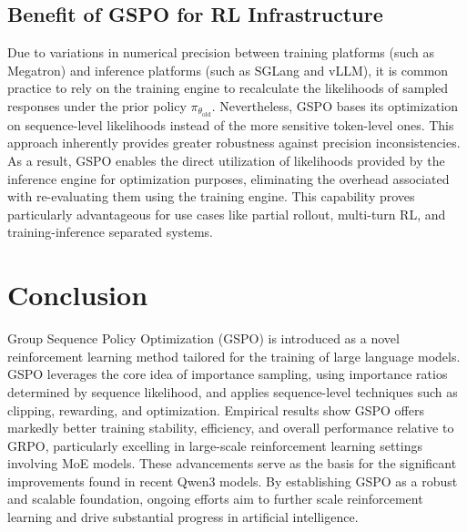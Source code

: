 \subsection{Benefit of GSPO for RL Infrastructure}

Due to variations in numerical precision between training platforms (such as Megatron) and inference platforms (such as SGLang and vLLM), it is common practice to rely on the training engine to recalculate the likelihoods of sampled responses under the prior policy $\pi_{\theta_\text{old}}$. Nevertheless, GSPO bases its optimization on sequence-level likelihoods instead of the more sensitive token-level ones. This approach inherently provides greater robustness against precision inconsistencies. As a result, GSPO enables the direct utilization of likelihoods provided by the inference engine for optimization purposes, eliminating the overhead associated with re-evaluating them using the training engine. This capability proves particularly advantageous for use cases like partial rollout, multi-turn RL, and training-inference separated systems.

\section{Conclusion}

Group Sequence Policy Optimization (GSPO) is introduced as a novel reinforcement learning method tailored for the training of large language models. GSPO leverages the core idea of importance sampling, using importance ratios determined by sequence likelihood, and applies sequence-level techniques such as clipping, rewarding, and optimization. Empirical results show GSPO offers markedly better training stability, efficiency, and overall performance relative to GRPO, particularly excelling in large-scale reinforcement learning settings involving MoE models. These advancements serve as the basis for the significant improvements found in recent Qwen3 models. By establishing GSPO as a robust and scalable foundation, ongoing efforts aim to further scale reinforcement learning and drive substantial progress in artificial intelligence.


